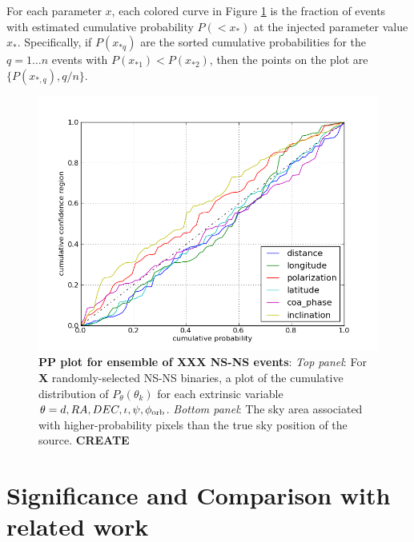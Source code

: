 \documentclass[twocolumn,prd,nofootinbib]{revtex4}
\begin{document}

For each parameter $x$, each colored curve in Figure  \ref{fig:pp:2015Ensemble} is  the fraction of events with
estimated cumulative probability $P(<x_*)$ at the injected parameter value $x_*$.  
Specifically, if $P(x_{*q})$ are the sorted cumulative probabilities for the $q=1\ldots n$ events with
$P(x_{*1})<P(x_{*2})$, then the points on the plot are $\{P(x_{*,q}),q/n\}$.  
%

\begin{figure}
\includegraphics[width=\columnwidth]{../Figures/v2_2015_BNS_MDC_skysampling_pp_plot}  %
\caption{\label{fig:pp:2015Ensemble}\textbf{PP plot for ensemble of XXX NS-NS events}: \emph{Top panel}: For \textbf{X} randomly-selected NS-NS binaries, a plot of
  the cumulative distribution of $P_\theta(\theta_k)$ for each extrinsic variable $\theta=d,RA,DEC,\iota,\psi,\phi_{\rm
    orb}$.
\emph{Bottom panel}: The sky area associated with higher-probability pixels than the true sky position of the source. \textbf{CREATE}
}
\end{figure}


\section{Significance and Comparison with related work }
\label{sec:Discussion}
\end{document}
